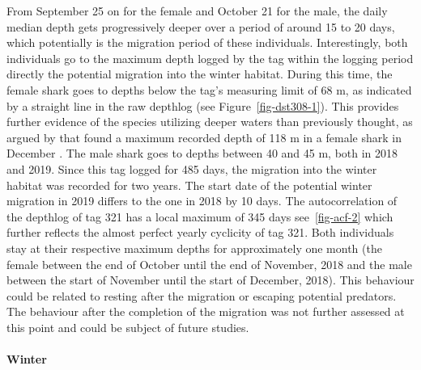 \documentclass[
  authoryear,
  review,
  3p]{elsarticle}
\let\oldparagraph\paragraph
\renewcommand{\paragraph}[1]{\oldparagraph{#1}\mbox{}}
\begin{document}
From September 25 on for the female and October 21 for the male, the
daily median depth gets progressively deeper over a period of around 15
to 20 days, which potentially is the migration period of these
individuals. Interestingly, both individuals go to the maximum depth
logged by the tag within the logging period directly the potential
migration into the winter habitat. During this time, the female shark
goes to depths below the tag's measuring limit of 68 m, as indicated by
a straight line in the raw depthlog (see Figure~\ref{fig-dst308-1}).
This provides further evidence of the species utilizing deeper waters
than previously thought, as argued by \citet{griffiths_2020} that found
a maximum recorded depth of 118 m in a female shark in December
\citep[S4]{griffiths_2020}. The male shark goes to depths between 40 and
45 m, both in 2018 and 2019. Since this tag logged for 485 days, the
migration into the winter habitat was recorded for two years. The start
date of the potential winter migration in 2019 differs to the one in
2018 by 10 days. The autocorrelation of the depthlog of tag 321 has a
local maximum of 345 days see~\ref{fig-acf-2} which further reflects the
almost perfect yearly cyclicity of tag 321. Both individuals stay at
their respective maximum depths for approximately one month (the female
between the end of October until the end of November, 2018 and the male
between the start of November until the start of December, 2018). This
behaviour could be related to resting after the migration or escaping
potential predators. The behaviour after the completion of the migration
was not further assessed at this point and could be subject of future
studies.

\hypertarget{winter}{%
\paragraph{Winter}\label{winter}}
\end{document}
